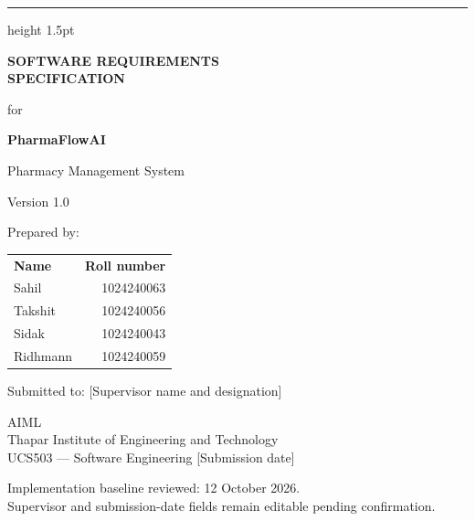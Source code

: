\documentclass[11pt,a4paper]{article}
\makeatletter
\newcommand{\Project}{PharmaFlowAI}
\newcommand{\Authors}{\begin{tabular}{@{}lr@{}}
\textbf{Name} & \textbf{Roll number}\\
Sahil & 1024240063\\
Takshit & 1024240056\\
Sidak & 1024240043\\
Ridhmann & 1024240059
\end{tabular}}
\newcommand{\Institution}{Thapar Institute of Engineering and Technology}
\newcommand{\Department}{AIML}
\newcommand{\Supervisor}{[Supervisor name and designation]}
\newcommand{\Course}{UCS503 --- Software Engineering}
\newcommand{\SubmissionDate}{[Submission date]}
\newcommand{\BaselineDate}{12 October 2026}
\makeatother
\begin{document}
\begin{titlepage}
\thispagestyle{plain}
\vspace*{8mm}
\hrule height 1.5pt
\vspace{12mm}
\begin{flushright}
{\LARGE\bfseries SOFTWARE REQUIREMENTS\\[3pt]SPECIFICATION\par}
\vspace{12mm}
{\Large for\par}
\vspace{10mm}
{\LARGE\bfseries \Project\par}
\vspace{4mm}
{\large Pharmacy Management System\par}
\vspace{10mm}
{\large Version 1.0\par}
\vspace{8mm}
{\large Prepared by:\\[4pt]\Authors\par}
\vspace{8mm}
{\large Submitted to: \Supervisor\par}
\vspace{9mm}
\Department\\\Institution\\\Course
\vspace{12mm}
\SubmissionDate
\end{flushright}
\vfill
{\small Implementation baseline reviewed: \BaselineDate.\\
Supervisor and submission-date fields remain editable pending confirmation.}
\end{titlepage}
\setcounter{page}{2}
\end{document}
